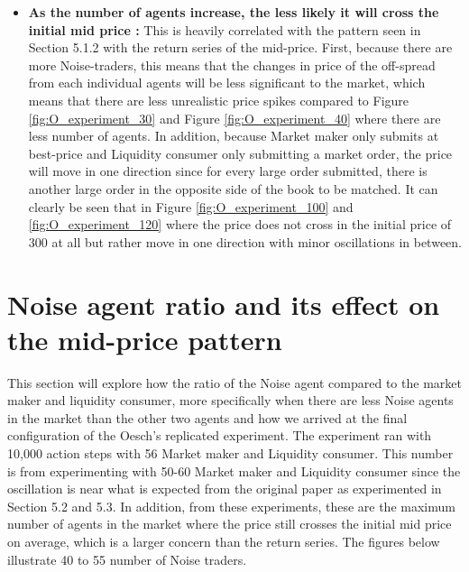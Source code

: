 \begin{itemize}
  \item \textbf{As the number of agents increase, the less likely it will cross the initial mid price : } This is heavily correlated with the pattern seen in Section 5.1.2 with the return series of the mid-price. First, because there are more Noise-traders, this means that the changes in price of the off-spread from each individual agents will be less significant to the market, which means that there are less unrealistic price spikes compared to Figure \ref{fig:O_experiment_30} and Figure \ref{fig:O_experiment_40} where there are less number of agents. In addition, because Market maker only submits at best-price and Liquidity consumer only submitting a market order, the price will move in one direction since for every large order submitted, there is another large order in the opposite side of the book to be matched. It can clearly be seen that in Figure \ref{fig:O_experiment_100} and \ref{fig:O_experiment_120} where the price does not cross in the initial price of 300 at all but rather move in one direction with minor oscillations in between. 
\end{itemize}

\section{Noise agent ratio and its effect on the mid-price pattern} 
This section will explore how the ratio of the Noise agent compared to the market maker and liquidity consumer, more specifically when there are less Noise agents in the market than the other two agents and how we arrived at the final configuration of the Oesch's replicated experiment. The experiment ran with 10,000 action steps with 56 Market maker and Liquidity consumer. This number is from experimenting with 50-60 Market maker and Liquidity consumer since the oscillation is near what is expected from the original paper as experimented in Section 5.2 and 5.3. In addition, from these experiments, these are the maximum number of agents in the market where the price still crosses the initial mid price on average, which is a larger concern than the return series. The figures below illustrate 40 to 55 number of Noise traders. 

